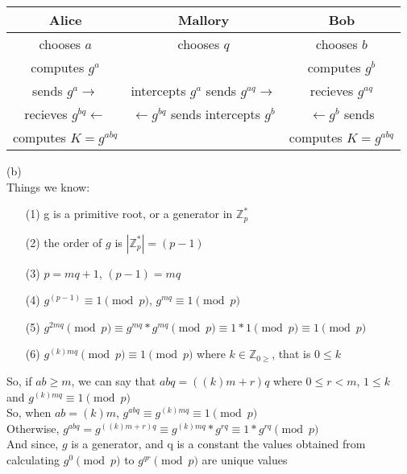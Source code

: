 \documentclass{assignment}
\begin{document}
\begin{flushleft}
\begin{problemlist}
\begin{tabular}{c | c | c}\\
Alice &Mallory &Bob\\ \hline
chooses $a$ &chooses $q$		&chooses $b$\\
computes $g^a$ &	&computes $g^b$\\
sends $g^a \rightarrow$ &intercepts  $g^a$ sends $g^{aq} \rightarrow$ &recieves $g^{aq}$\\
recieves $g^{bq} \leftarrow$ &$\leftarrow g^{bq}$ sends  intercepts  $g^b$   &$\leftarrow g^{b}$ sends \\ 
computes $K = g^{abq}$	& 	&computes $K = g^{abq}$\\ 
\end{tabular}
\item [(b)]\hspace{1cm}\\
Things we know:
\begin{enumerate}
\item[(1)] g is a primitive root, or a generator in $\mathbb{Z}^{*}_{p}$\\
\item[(2)] the order of $g$ is $|\mathbb{Z}^{*}_{p}| = (p-1)$\\
\item[(3)] $p = mq + 1$, $(p-1) = mq$\\
\item[(4)] $g^{(p-1)} \equiv 1 \pmod{p}$, $g^{mq} \equiv 1 \pmod{p}$\\
\item[(5)] $g^{2mq} \pmod{p} \equiv g^{mq} * g^{mq} \pmod{p} \equiv 1 * 1 \pmod{p} \equiv 1 \pmod{p}$\\
\item[(6)] $g^{(k)mq} \pmod{p} \equiv 1 \pmod{p} $ where $k \in \mathbb{Z}_{0\geq}$, that is $0 \leq k$\\
\end{enumerate}
\begin{doublespace}
So, if $ab \geq m$, we can say that $abq = ((k)m + r)q$ where $0 \leq r < m$, $1 \leq k$\\
and $g^{(k)mq} \equiv 1 \pmod{p}$\\
So, when $ab = (k)m$, $g^{abq} \equiv g^{(k)mq} \equiv 1 \pmod{p}$\\
Otherwise, $g^{abq} = g^{((k)m + r)q} \equiv g^{(k)mq} * g^{rq} \equiv 1 * g^{rq} \pmod{p}$\\
And since, $g$ is a generator, and q is a constant the values obtained from calculating $g^{0}\pmod{p}$ to $g^{qr} \pmod{p}$ are unique values

\end{doublespace}
\end{problemlist}
\end{flushleft}
\end{document}
